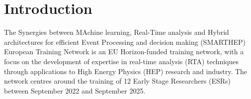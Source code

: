 \section{Introduction}
\label{intro}
The Synergies between MAchine learning, Real-Time analysis and Hybrid architectures for efficient Event Processing and decision making (SMARTHEP) European Training Network is an EU Horizon-funded training network, with a focus on the development of expertise in real-time analysis (RTA) techniques through applications to High Energy Physics (HEP) research and industry. The network centres around the training of 12 Early Stage Researchers (ESRs) between September 2022 and September 2025.